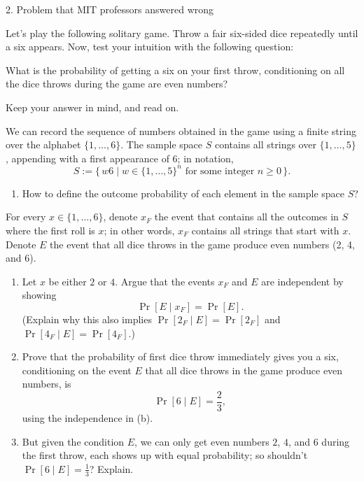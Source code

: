 \documentclass[12pt]{article}
\begin{document}
\begin{problem}{2. Problem that MIT professors answered wrong}

Let’s play the following solitary game. Throw a fair six-sided dice repeatedly until a six appears. Now, test your intuition with the following question:

What is the probability of getting a six on your first throw, conditioning on all the dice throws during the game are even numbers?

Keep your answer in mind, and read on.

We can record the sequence of numbers obtained in the game using a finite string over the alphabet $\{1, \dots, 6\}$. The sample space $S$ contains all strings over $\{1, \dots, 5\}$, appending with a first appearance of $6$; in notation,
\[
S := \{\, w6 \mid w \in \{1, \dots, 5\}^n \text{ for some integer } n \ge 0 \,\}.
\]

\begin{enumerate}
    \item How to define the outcome probability of each element in the sample space $S$?
\end{enumerate}

For every $x \in \{1, \dots, 6\}$, denote $x_F$ the event that contains all the outcomes in $S$ where the first roll is $x$; in other words, $x_F$ contains all strings that start with $x$. Denote $E$ the event that all dice throws in the game produce even numbers (2, 4, and 6).

\begin{enumerate}
    \item[2.] Let $x$ be either $2$ or $4$. Argue that the events $x_F$ and $E$ are independent by showing
    \[
    \Pr[E \mid x_F] = \Pr[E].
    \]
    (Explain why this also implies $\Pr[2_F \mid E] = \Pr[2_F]$ and $\Pr[4_F \mid E] = \Pr[4_F]$.)
    
    \item [3.]Prove that the probability of first dice throw immediately gives you a six, conditioning on the event $E$ that all dice throws in the game produce even numbers, is
    \[
    \Pr[6 \mid E] = \frac{2}{3},
    \]
    using the independence in (b).
    
    \item[4.] But given the condition $E$, we can only get even numbers $2$, $4$, and $6$ during the first throw, each shows up with equal probability; so shouldn’t $\Pr[6 \mid E] = \frac{1}{3}$? Explain.
\end{enumerate}
\end{problem}
\end{document}

